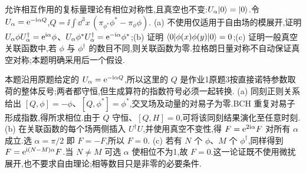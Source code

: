 \begin{exercise}
允许相互作用的复标量理论有相位对称性,且真空也不变:$U_\alpha\lvert 0\rangle=\lvert 0\rangle$.令
$U_\alpha=\mathrm e^{-\mathrm i\alpha Q}$,$Q=\ii\int\dd^3x\,(\pi_{\phi^*}\phi^*-\pi_\phi\phi)$.
(a) 不使用仅适用于自由场的模展开,证明 $U_\alpha\phi U_\alpha^\dagger=\mathrm e^{\mathrm i\alpha}\phi$、$U_\alpha\phi^* U_\alpha^\dagger=\mathrm e^{-\mathrm i\alpha}\phi^*$;(b) 证明 $\langle 0\rvert\phi(x)\phi(y)\lvert 0\rangle=0$;(c) 证明一般真空关联函数中,若 $\phi$ 与 $\phi^\dagger$ 的数目不同,则关联函数为零.拉格朗日量对称不自动保证真空对称;本题明确采用后一个假设.
\end{exercise}
\begin{solution}
本题沿用原题给定的 $U_\alpha=\mathrm e^{-\mathrm i\alpha Q}$,所以这里的 $Q$ 是作业1原题3按直接诺特参数取荷的整体反号;两者都守恒,但生成算符的指数符号必须一起转换.
(a) 同刻正则关系给出 $[Q,\phi]=-\phi$、$[Q,\phi^*]=\phi^*$,交叉场及动量的对易子为零.BCH 重复对易子形成指数,得所求相位.由于 $Q$ 守恒、$[Q,H]=0$,可将该同刻结果演化至任意时刻.
(b) 在关联函数的每个场两侧插入 $U^\dagger U$,并使用真空不变性,得 $F=\mathrm e^{2\mathrm i\alpha}F$ 对所有 $\alpha$ 成立.选 $\alpha=\pi/2$ 即 $F=-F$,所以 $F=0$.
(c) 若有 $N$ 个 $\phi$、$M$ 个 $\phi^\dagger$,同样得到 $F=\mathrm e^{\mathrm i(N-M)\alpha}F$.当 $N\ne M$ 可选 $\alpha$ 使相位不为1,故 $F=0$.这一论证既不使用微扰展开,也不要求自由理论;相等数目只是非零的必要条件.
\end{solution}
